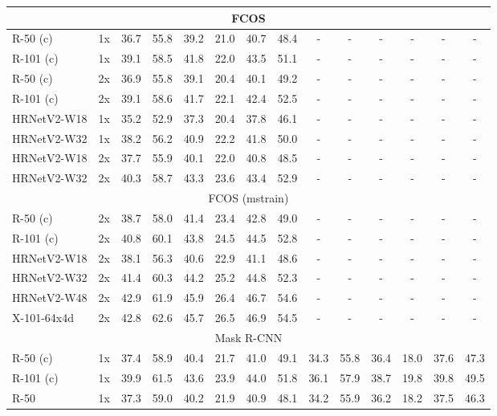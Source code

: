 \documentclass[10pt,journal,compsoc]{IEEEtran}
\begin{document}
\begin{center}
\begin{longtable}{l|c|cccccc|cccccc}
	\multicolumn{14}{c}{FCOS}\\
	\hline
	R-50 (c)    & 1x & 36.7 & 55.8 & 39.2 & 21.0 & 40.7 & 48.4 & -    & -    & -    & -    & -    & -   \\
	R-101 (c)   & 1x & 39.1 & 58.5 & 41.8 & 22.0 & 43.5 & 51.1 & -    & -    & -    & -    & -    & -   \\
	R-50 (c)    & 2x & 36.9 & 55.8 & 39.1 & 20.4 & 40.1 & 49.2 & -    & -    & -    & -    & -    & -    \\
	R-101 (c)   & 2x & 39.1 & 58.6 & 41.7 & 22.1 & 42.4 & 52.5 & -    & -    & -    & -    & -    & -    \\
    {HRNetV2-W18} & 1x & 35.2 & 52.9 & 37.3 & 20.4 & 37.8 & 46.1 & -    & -    & -    & -    & -    & -   \\
    {HRNetV2-W32} & 1x & 38.2 & 56.2 & 40.9 & 22.2 & 41.8 & 50.0 & -    & -    & -    & -    & -    & -   \\
    {HRNetV2-W18} & 2x & 37.7 & 55.9 & 40.1 & 22.0 & 40.8 & 48.5 & -    & -    & -    & -    & -    & -   \\
    {HRNetV2-W32} & 2x & 40.3 & 58.7 & 43.3 & 23.6 & 43.4 & 52.9 & -    & -    & -    & -    & -    & -   \\
	\hline
	\multicolumn{14}{c}{FCOS (mstrain)}\\
	\hline
	R-50 (c)    & 2x & 38.7 & 58.0 & 41.4 & 23.4 & 42.8 & 49.0 & -    & -    & -    & -    & -    & -   \\
	R-101 (c)   & 2x & 40.8 & 60.1 & 43.8 & 24.5 & 44.5 & 52.8 & -    & -    & -    & -    & -    & -   \\
	{HRNetV2-W18} & 2x & 38.1 & 56.3 & 40.6 & 22.9 & 41.1 & 48.6 & -    & -    & -    & -    & -    & -   \\
	{HRNetV2-W32} & 2x & 41.4 & 60.3 & 44.2 & 25.2 & 44.8 & 52.3 & -    & -    & -    & -    & -    & -   \\
	{HRNetV2-W48} & 2x & 42.9 & 61.9 & 45.9 & 26.4 & 46.7 & 54.6 & -    & -   & -    & -    & -    & -   \\
	X-101-64x4d & 2x & 42.8 & 62.6 & 45.7 & 26.5 & 46.9 & 54.5 & -    & -    & -    & -    & -    & -   \\
	\hline
	\multicolumn{14}{c}{Mask R-CNN} \\
	\hline
	R-50 (c)    & 1x & 37.4 & 58.9 & 40.4 & 21.7 & 41.0 & 49.1 & 34.3 & 55.8 & 36.4 & 18.0 & 37.6 & 47.3 \\
	R-101 (c)   & 1x & 39.9 & 61.5 & 43.6 & 23.9 & 44.0 & 51.8 & 36.1 & 57.9 & 38.7 & 19.8 & 39.8 & 49.5 \\
	R-50        & 1x & 37.3 & 59.0 & 40.2 & 21.9 & 40.9 & 48.1 & 34.2 & 55.9 & 36.2 & 18.2 & 37.5 & 46.3 \\

\end{longtable}
\end{center}
\end{document}
